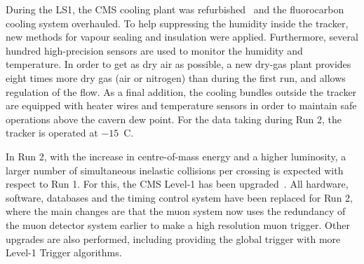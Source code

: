 During the LS1, the CMS cooling plant was refurbished~\cite{running:1998606} and the fluorocarbon cooling system overhauled. To help suppressing the humidity inside the tracker, new methods for vapour sealing and insulation were applied. Furthermore, several hundred high-precision sensors are used to monitor the humidity and temperature. In order to get as dry air as possible, a new dry-gas plant provides eight times more dry gas (air or nitrogen) than during the first run, and allows regulation of the flow. As a final addition, the cooling bundles outside the tracker are equipped with heater wires and temperature sensors in order to maintain safe operations above the cavern dew point. For the data taking during Run 2, the tracker is operated at $-15$~\degree C.

%		
%	
In Run 2, with the increase in centre-of-mass energy and a higher luminosity, a larger number of simultaneous inelastic collisions per crossing is expected with respect to Run 1. For this, the CMS Level-1 has been upgraded~\cite{1748-0221-12-03-C03021}. All hardware, software, databases and the timing control system have been replaced for Run 2, where the main changes are that the muon system now uses the redundancy of the muon detector system earlier to make a high resolution muon trigger. Other upgrades are also performed, including providing the global trigger with more Level-1 Trigger algorithms. 



